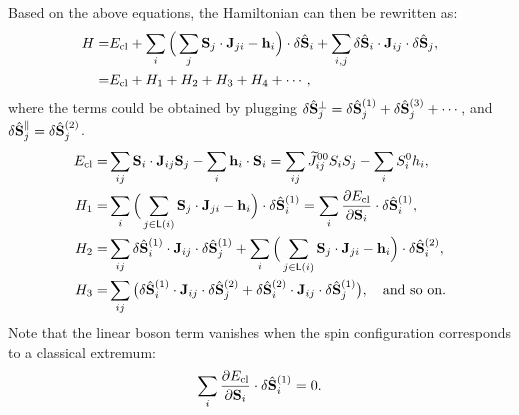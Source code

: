 \documentclass[aps, prx, nofootinbib, superscriptaddress]{revtex4-2}
\begin{document}
Based on the above equations, the Hamiltonian can then be rewritten as:
\begin{equation}
    \begin{split}
        H = & E_{\rm cl}
        + \sum_{i} \Big( \sum_{j} \mathbf{S}_{j} \cdot \mathbf{J}_{ji} - \mathbf{h}_{i} \Big) \cdot \delta \hat{\mathbf{S}}_{i}
        + \sum_{i,j} \delta \hat{\mathbf{S}}_{i} \cdot \mathbf{J}_{ij} \cdot \delta \hat{\mathbf{S}}_{j}, \\
        = & E_{\rm cl} + H_{1} + H_{2} + H_{3} + H_{4} + \cdots,
    \end{split}
\end{equation}
where the terms could be obtained by plugging $\delta \hat{\bf S}_{j}^{\perp} = \delta \hat{\mathbf{S}}_{j}^{(1)} + \delta \hat{\mathbf{S}}_{j}^{(3)} + \cdots$, and $\delta \hat{\bf S}_{j}^{\parallel} = \delta \hat{\bf S}_{j}^{(2)}$.
\begin{equation}
    \begin{split}
        E_{\rm cl} 
        = & \sum_{ij} \mathbf{S}_i \cdot \mathbf{J}_{ij} \mathbf{S}_j - \sum_{i} \mathbf{h}_{i} \cdot \mathbf{S}_{i}
        = \sum_{ij}  \widetilde{J}_{ij}^{00} S_{i} S_{j} - \sum_{i} S_{i}^{0} h_{i}, \\
        H_{1} = & \sum_{i} \Big( \sum_{j \in \mathsf{L}(i)} \mathbf{S}_{j} \cdot \mathbf{J}_{ji} - \mathbf{h}_{i} \Big) \cdot \delta \hat{\mathbf{S}}_{i}^{(1)} 
        = \sum_{i} \frac{\partial E_{\rm cl}}{\partial \mathbf{S}_{i}} \cdot \delta \hat{\mathbf{S}}_{i}^{(1)}, \\
        H_{2} = & \sum_{ij} \delta \hat{\mathbf{S}}_{i}^{(1)} \cdot \mathbf{J}_{ij} \cdot \delta \hat{\mathbf{S}}_{j}^{(1)} 
        + \sum_{i} \Big( \sum_{j\in \mathsf{L}(i)} \mathbf{S}_{j} \cdot \mathbf{J}_{ji} - \mathbf{h}_{i} \Big) \cdot \delta \hat{\mathbf{S}}_{i}^{(2)}, \\
        H_{3} = & \sum_{ij} \big( \delta \hat{\mathbf{S}}_{i}^{(1)} \cdot \mathbf{J}_{ij} \cdot \delta \hat{\mathbf{S}}_{j}^{(2)} + \delta \hat{\mathbf{S}}_{i}^{(2)} \cdot \mathbf{J}_{ij} \cdot \delta \hat{\mathbf{S}}_{j}^{(1)} \big), 
        \quad \text{and so on.} 
    \end{split}
\end{equation}
Note that the linear boson term vanishes when the spin configuration corresponds to a classical extremum:
\begin{equation}
    \sum_{i} \frac{\partial E_{\rm cl}}{\partial \mathbf{S}_{i}} \cdot \delta \hat{\mathbf{S}}_{i}^{(1)} = 0.
\end{equation}
\end{document}
